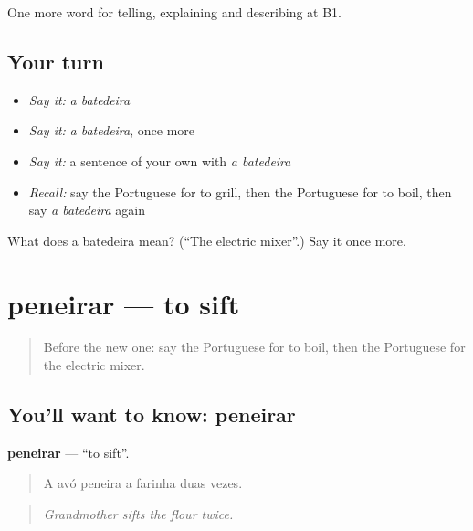 \begin{grammarlens}[title={What you've built}]
One more word for telling, explaining and describing at B1.
\end{grammarlens}

\subsection*{Your turn}
\begin{itemize}
\raggedright
  \item \emph{Say it:} \emph{a batedeira}
  \item \emph{Say it:} \emph{a batedeira}, once more
  \item \emph{Say it:} a sentence of your own with \emph{a batedeira}
  \item \emph{Recall:} say the Portuguese for to grill, then the Portuguese for to boil, then say \emph{a batedeira} again
\end{itemize}

\begin{tcolorbox}[breakable,colback=teal!4,colframe=teal!35!black,title={Before you move on}]
What does a batedeira mean? (\textquotedblleft{}The electric mixer\textquotedblright{}.) Say it once more.
\end{tcolorbox}
\section[peneirar]{peneirar — to sift}

\label{lesson:PT-C333-peneirar}



\begin{quote}
Before the new one: say the Portuguese for to boil, then the Portuguese for the electric mixer.
\end{quote}

\subsection*{You'll want to know: peneirar}
\textbf{peneirar} — \textquotedblleft{}to sift\textquotedblright{}.

\begin{quote}
A avó peneira a farinha duas vezes.
\end{quote}

\begin{quote}
\emph{Grandmother sifts the flour twice.}
\end{quote}

